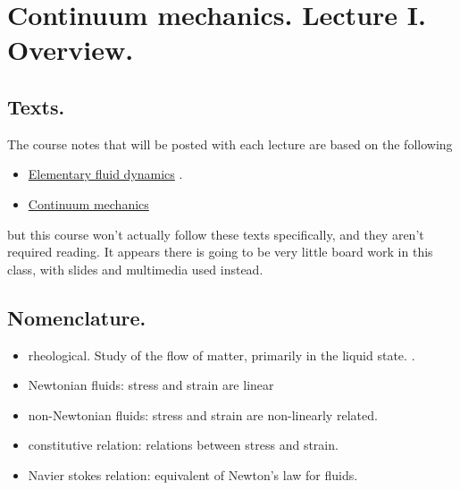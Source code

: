 %
%

\chapter{Continuum mechanics.  Lecture I.  Overview.}
\label{chap:continuumL1}
{}
\date{Jan 11, 2012}

\beginArtWithToc

\section{Texts.}

The course notes that will be posted with each lecture are based on the following

\begin{itemize}
\item \href{http://www.amazon.com/Elementary-Dynamics-Applied-Mathematics-Computing/dp/0198596790/ref=sr_1_1?ie=UTF8&qid=1326302753&sr=8-1}{Elementary fluid dynamics} \cite{acheson1990elementary}.
\item \href{http://www.amazon.com/Theory-Elasticity-Third-Theoretical-Physics/dp/075062633X/ref=sr_1_6?s=books&ie=UTF8&qid=1326302957&sr=1-6}{Continuum mechanics} \cite{landau1960theory}
\end{itemize}


but this course won't actually follow these texts specifically, and they aren't required reading.  It appears there is going to be very little board work in this class, with slides and multimedia used instead.

\section{Nomenclature.}

\begin{itemize}
\item rheological.  Study of the flow of matter, primarily in the liquid state.  \cite{wiki:rheology}.
\item Newtonian fluids: stress and strain are linear
\item non-Newtonian fluids: stress and strain are non-linearly related.
\item constitutive relation: relations between stress and strain.
\item Navier stokes relation: equivalent of Newton's law for fluids.
\end{itemize}

\EndArticle
